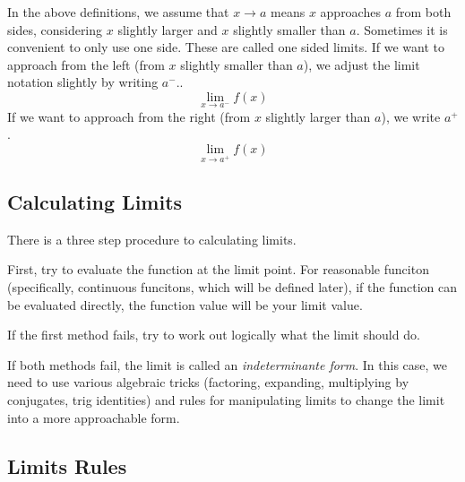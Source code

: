 \documentclass[fleqn]{report}
\begin{document}
In the above definitions, we assume that $x \rightarrow a$
means $x$ approaches $a$ from both sides, considering $x$ slightly
larger and $x$ slightly smaller than $a$. Sometimes it is
convenient to only use one side. These are called one sided
limits. If we want to approach from the left (from $x$
slightly smaller than $a$), we adjust the limit notation
slightly by writing $a^-$..
\begin{equation*}
\lim_{x \rightarrow a^-} f(x)
\end{equation*}
If we want to approach from the right (from $x$ slightly
larger than $a$), we write $a^+$. 
\begin{equation*}
\lim_{x \rightarrow a^+} f(x)
\end{equation*}

\subsection{Calculating Limits}
\label{calculation-limits}

There is a three step procedure to calculating limits.
\begin{smallitemize}
\item First, try to evaluate the function at the limit point.
For reasonable funciton (specifically, continuous funcitons,
which will be defined later), if the function can be evaluated
directly, the function value will be your limit value.
\item If the first method fails, try to work out logically
what the limit should do. 
\item If both methods fail, the limit is called an
\emph{indeterminante form}. In this case, we need to use
various algebraic tricks (factoring, expanding, multiplying by
conjugates, trig identities) and rules for manipulating limits
to change the limit into a more approachable form.
\end{smallitemize}

\subsection{Limits Rules}
\label{limit-rules}
\end{document}

